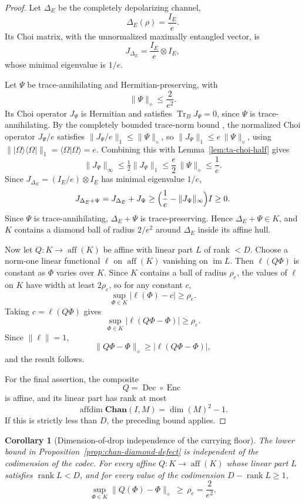 \documentclass[11pt]{article}
\newtheorem{corollary}[theorem]{Corollary}
\DeclareMathOperator{\affdim}{affdim}
\DeclareMathOperator{\aff}{aff}
\DeclareMathOperator{\Tr}{Tr}
\DeclareMathOperator{\rank}{rank}
\begin{document}
\begin{proof}
Let $\Delta_E$ be the completely depolarizing channel,
\[
\Delta_E(\rho)=\frac{I_E}{e}.
\]
Its Choi matrix, with the unnormalized maximally entangled vector, is
\[
J_{\Delta_E}
=
\frac{I_E}{e}\otimes I_E,
\]
whose minimal eigenvalue is $1/e$.

Let $\Psi$ be trace-annihilating and Hermitian-preserving, with
\[
\|\Psi\|_\diamond\le \frac2{e^2}.
\]
Its Choi operator $J_\Psi$ is Hermitian and satisfies $\Tr_B J_\Psi=0$, since
$\Psi$ is trace-annihilating. By the completely bounded trace-norm bound
\cite{Watrous2018, NechitaPuchalaPawelaZyczkowski2018}, the normalized Choi
operator $J_\Psi/e$ satisfies $\|J_\Psi/e\|_1\le\|\Psi\|_\diamond$, so
$\|J_\Psi\|_1\le e\,\|\Psi\|_\diamond$, using
$\||\Omega\rangle\langle\Omega|\|_1=\langle\Omega|\Omega\rangle=e$. Combining
this with Lemma~\ref{lem:ta-choi-half} gives
\[
\|J_\Psi\|_\infty
\le
\tfrac12\|J_\Psi\|_1
\le
\frac{e}{2}\,\|\Psi\|_\diamond
\le
\frac1e .
\]
Since
$J_{\Delta_E}=(I_E/e)\otimes I_E$ has minimal eigenvalue $1/e$,
\[
J_{\Delta_E+\Psi}
=
J_{\Delta_E}+J_\Psi
\ge
\Bigl(\frac1e-\|J_\Psi\|_\infty\Bigr)I
\ge
0.
\]
Since $\Psi$ is trace-annihilating, $\Delta_E+\Psi$ is trace-preserving.
Hence $\Delta_E+\Psi\in K$, and $K$ contains a diamond ball of radius
$2/e^2$ around $\Delta_E$ inside its affine hull.

Now let $Q:K\to\aff(K)$ be affine with linear part $L$ of rank $<D$. Choose
a norm-one linear functional $\ell$ on $\aff(K)$ vanishing on
$\operatorname{im}L$. Then $\ell(Q\Phi)$ is constant as $\Phi$ varies over
$K$. Since $K$ contains a ball of radius $\rho_e$, the values of $\ell$ on
$K$ have width at least $2\rho_e$, so for any constant $c$,
\[
\sup_{\Phi\in K}|\ell(\Phi)-c|\ge\rho_e.
\]
Taking $c=\ell(Q\Phi)$ gives
\[
\sup_{\Phi\in K}
|\ell(Q\Phi-\Phi)|
\ge
\rho_e.
\]
Since $\|\ell\|=1$,
\[
\|Q\Phi-\Phi\|_\diamond
\ge
|\ell(Q\Phi-\Phi)|,
\]
and the result follows.

For the final assertion, the composite
\[
Q=\operatorname{Dec}\circ\operatorname{Enc}
\]
is affine, and its linear part has rank at most
\[
\affdim\mathbf{Chan}(I,M)=\dim(M)^2-1.
\]
If this is strictly less than $D$, the preceding bound applies.
\end{proof}

\begin{corollary}[Dimension-of-drop independence of the currying floor]
\label{cor:drop-independence}
The lower bound in Proposition~\ref{prop:chan-diamond-defect} is independent of
the codimension of the codec. For every affine
$Q:K\to\aff(K)$ whose linear part $L$ satisfies $\rank L<D$, and for every
value of the codimension $D-\rank L\ge1$,
\[
\sup_{\Phi\in K}\|Q(\Phi)-\Phi\|_\diamond\ \ge\ \rho_e=\frac2{e^2}.
\]
\end{corollary}
\end{document}
